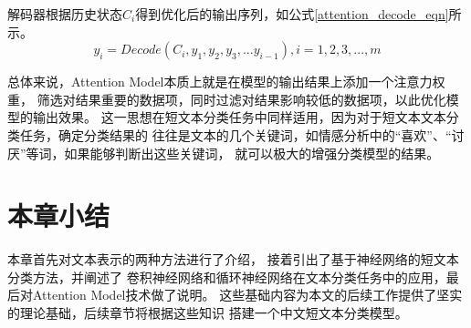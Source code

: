 \documentclass{standalone}
\begin{document}
解码器根据历史状态$C_i$得到优化后的输出序列，如公式\ref{attention_decode_eqn}所示。
\begin{equation}
    y_i=Decode\left ( C_i,y_1,y_2,y_3,...y_{i-1} \right ),i=1,2,3,...,m
    \label{attention_decode_eqn}
\end{equation}

总体来说，Attention Model本质上就是在模型的输出结果上添加一个注意力权重，
筛选对结果重要的数据项，同时过滤对结果影响较低的数据项，以此优化模型的输出效果。
这一思想在短文本分类任务中同样适用，因为对于短文本文本分类任务，确定分类结果的
往往是文本的几个关键词，如情感分析中的“喜欢”、“讨厌”等词，如果能够判断出这些关键词，
就可以极大的增强分类模型的结果。

\section{本章小结}
本章首先对文本表示的两种方法进行了介绍，
接着引出了基于神经网络的短文本分类方法，并阐述了
卷积神经网络和循环神经网络在文本分类任务中的应用，最后对Attention Model技术做了说明。
这些基础内容为本文的后续工作提供了坚实的理论基础，后续章节将根据这些知识
搭建一个中文短文本分类模型。
\end{document}
